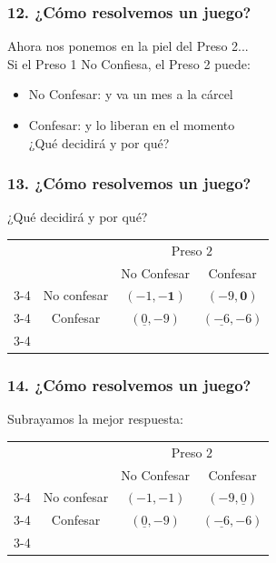 \documentclass[14pt]{beamer}
\begin{document}
\begin{frame}
\frametitle{12. ¿Cómo resolvemos un juego?}
Ahora nos ponemos en la piel del Preso 2... \\ \vspace{2mm}
Si el Preso 1 No Confiesa, el Preso 2 puede: 
\\ \vspace{2mm} 
\begin{itemize}
    \item No Confesar: y va un mes a la cárcel \\ \vspace{2mm}
    \item Confesar: y lo liberan en el momento
    \\ \vspace{2mm}
    ¿Qué decidirá y por qué?
\end{itemize}
\end{frame}

\begin{frame}
\frametitle{13. ¿Cómo resolvemos un juego?}
¿Qué decidirá y por qué?
\begin{table}
     \begin{tabular}{cc|c|c|}
      & \multicolumn{1}{c}{} & \multicolumn{2}{c}{Preso $2$}\\
      & \multicolumn{1}{c}{} & \multicolumn{1}{c}{No Confesar}  & \multicolumn{1}{c}{Confesar} \\\cline{3-4}
      \multirow{}{Preso $1$}  & No confesar & $(-1,\boldsymbol{-1})$ & $(-9,\boldsymbol{0})$ \\\cline{3-4}
      & Confesar & $(\underline{0},-9)$ & $(\underline{-6},-6)$ \\\cline{3-4}
    \end{tabular}
  \end{table}
\end{frame}

\begin{frame}
\frametitle{14. ¿Cómo resolvemos un juego?}
Subrayamos la mejor respuesta:
\begin{table}
     \begin{tabular}{cc|c|c|}
      & \multicolumn{1}{c}{} & \multicolumn{2}{c}{Preso $2$}\\
      & \multicolumn{1}{c}{} & \multicolumn{1}{c}{No Confesar}  & \multicolumn{1}{c}{Confesar} \\\cline{3-4}
      \multirow{}{Preso $1$}  & No confesar & $(-1,-1)$ & $(-9,\underline{0})$ \\\cline{3-4}
      & Confesar & $(\underline{0},-9)$ & $(\underline{-6},-6)$ \\\cline{3-4}
    \end{tabular}
  \end{table}
\end{frame}
\end{document}
